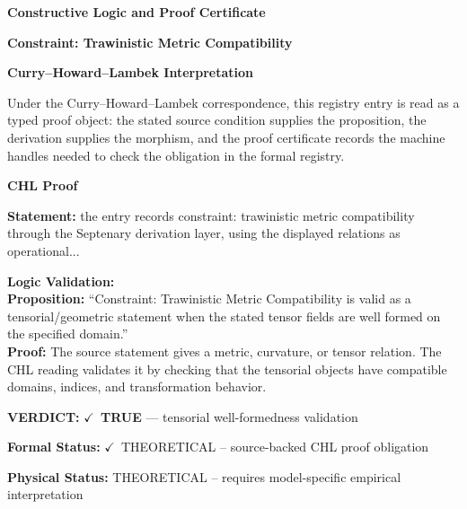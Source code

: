 \clearpage
\begingroup\tzpsupportsetup
\noindent\textbf{\fontsize{10.8pt}{12.8pt}\selectfont [ID 0670] Constructive Logic and Proof Certificate}\par
\noindent\textbf{\fontsize{10pt}{12pt}\selectfont Constraint: Trawinistic Metric Compatibility}\par
\vspace{0.45em}
\begingroup
\footnotesize
\setlength{\parskip}{0.22em}
\setlength{\parindent}{0pt}
\noindent\textbf{Curry--Howard--Lambek Interpretation}\par
Under the Curry--Howard--Lambek correspondence, this registry entry is read as a typed proof
object: the stated source condition supplies the proposition, the derivation supplies the
morphism, and the proof certificate records the machine handles needed to check the obligation
in the formal registry.

\vspace{0.45em}
\noindent\textbf{CHL Proof}\par
\textbf{Statement:} the entry records constraint: trawinistic metric compatibility through the Septenary
derivation layer, using the displayed relations as operational...

\textbf{Logic Validation:}\\
\textbf{Proposition:} ``Constraint: Trawinistic Metric Compatibility is valid as a tensorial/geometric statement
when the stated tensor fields are well formed on the specified domain.''\\
\textbf{Proof:} The source statement gives a metric, curvature, or tensor relation. The CHL reading
validates it by checking that the tensorial objects have compatible domains, indices,
and transformation behavior.

\textbf{VERDICT:} \ensuremath{\checkmark}\ \textbf{TRUE} --- tensorial well-formedness validation

\textbf{Formal Status:} \ensuremath{\checkmark}\ THEORETICAL -- source-backed CHL proof obligation

\textbf{Physical Status:} THEORETICAL -- requires model-specific empirical interpretation
\par\vspace{0.45em}
\par
\ifTZPDarkEdition
{}
\fi
\endgroup
\endgroup
